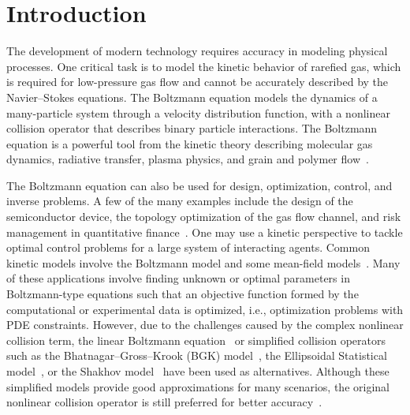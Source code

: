 \documentclass[times,final,nopreprintline]{elsarticle}
\begin{document}

\section{Introduction}
The development of modern technology requires accuracy in modeling physical processes. One critical task is to model the kinetic behavior of rarefied gas, which is required for low-pressure gas flow and cannot be accurately described by the Navier--Stokes equations. The Boltzmann equation models the dynamics of a many-particle system through a velocity distribution function, with a nonlinear collision operator that describes binary particle interactions. The Boltzmann equation is a powerful tool from the kinetic theory describing molecular gas dynamics, radiative transfer, plasma physics, and grain and polymer flow~\cite{alonso2015boltzmann}.

The Boltzmann equation can also be used for design, optimization, control, and inverse problems. A few of the many examples include the design of the semiconductor device, the topology optimization of the gas flow channel, and risk management in quantitative finance~\cite{choulli1996inverse,dragulescu2003applications,cheng2011recovering,sato2019topology,lai2020reconstruction}. One may use a kinetic perspective to tackle optimal control problems for a large system of interacting agents. Common kinetic models involve the Boltzmann model and some mean-field models~\cite{toscani2006kinetic,caponigro2013sparse,albi2014boltzmann,fornasier2014mean2,fornasier2014mean,albi2015kinetic}. Many of these applications involve finding unknown or optimal parameters in  Boltzmann-type equations such that an objective function formed by the computational or experimental data is optimized, i.e., optimization problems with  PDE constraints. However, due to the challenges caused by the complex nonlinear collision term, the linear Boltzmann equation~\cite{choulli1996inverse} or simplified collision operators such as the Bhatnagar–Gross–Krook (BGK) model~\cite{bhatnagar1954model,sato2019topology}, the Ellipsoidal Statistical model~\cite{holway1966kinetic}, or the Shakhov model~\cite{shakhov1968generalization} have been used as alternatives. Although these simplified models provide good approximations for many scenarios, the original nonlinear collision operator is still preferred for better accuracy~\cite{cercignani1988boltzmann}.
\end{document}
